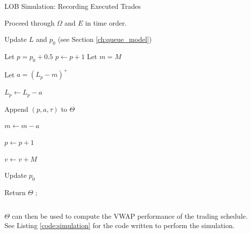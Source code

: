 \begin{algorithm}[H]
\SetAlgoLined
\caption{LOB Simulation: Recording Executed Trades}
Proceed through $\Omega$ and $E$ in time order. 

 {
     {
        Update $L$ and $p_0$ (see Section \ref{ch:queue_model}) \;
    }
     {
        Let $p = p_0 + 0.5$ \;
         {
            $p \leftarrow p + 1$
        }
        Let $m = M$ \;
         {
            Let $a = (L_p - m)^+$ \;
            
            $L_p \leftarrow L_p - a$ \;
            
            Append $(p, a, \tau)$ to $\Theta$ \;

            $m \leftarrow m - a$ \;
    
            $p \leftarrow p + 1$ \;
        }
        $v \leftarrow v + M$ \;
        
        Update $p_0$ \;
    }
}

Return $\Theta$ ;
\end{algorithm}

$$ $$

$\Theta$ can then be used to compute the VWAP performance of the trading schedule. See Listing \ref{code:simulation} for the code written to perform the simulation.